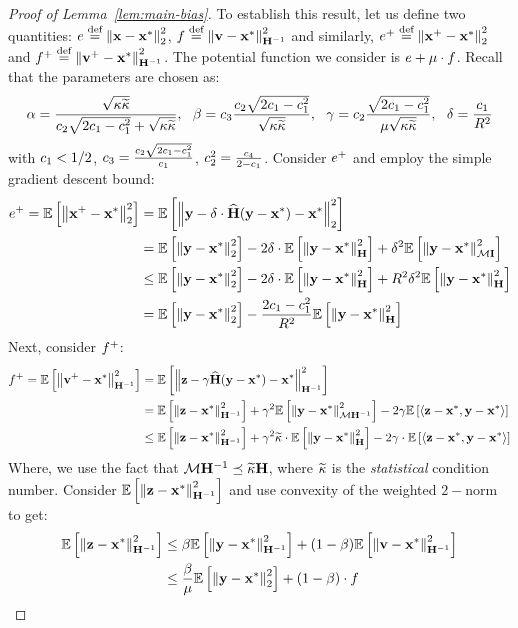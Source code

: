 \begin{proof}[Proof of Lemma~\ref{lem:main-bias}]
To establish this result, let us define two quantities: $e \stackrel{\textrm{def}}{=} {\left\| \mathbf{x}-\mathbf{x}^* \right\|_2^2}$, $f \stackrel{\textrm{def}}{=} {\left\| \mathbf{v}-\mathbf{x}^* \right\|^2_{{\mathbf{H}}^{-1}}}$ and similarly, $e^+ \stackrel{\textrm{def}}{=} {\left\| \mathbf{x}^+-\mathbf{x}^* \right\|_2^2}$ and $f^+ \stackrel{\textrm{def}}{=} {\left\| \mathbf{v}^+-\mathbf{x}^* \right\|^2_{{\mathbf{H}}^{-1}}}$. The potential function we consider is $e + \mu\cdot f$. Recall that the parameters are chosen as:
\begin{align*}
\alpha = \frac{\sqrt{\cnH\cnHh}}{\ctwo\sqrt{2\cone-\cone^2}+\sqrt{\cnH\cnHh}},\ \  \beta = \cthree\frac{\ctwo\sqrt{2\cone-\cone^2}}{\sqrt{\cnH\cnHh}},\ \  \gamma = \ctwo\frac{\sqrt{2\cone-\cone^2}}{\mu\sqrt{\cnH\cnHh}}, \ \ \delta=\frac{\cone}{\infbound}
\end{align*}
with $c_1<1/2$, $c_3=\frac{c_2\sqrt{2c_1-c_1^2}}{c_1}$, $c_2^2=\frac{c_4}{2-c_1}$.
Consider $e^+$ and employ the simple gradient descent bound:
\begin{align}
\label{eq:gd}
\eplus=\E{\twonorm{\xplus-\xs}^2}&=\E{\twonorm{\y-\delta\cdot\Hhat(\y-\xs)-\xs}^2}\nonumber\\
&=\E{\twonorm{\y-\xs}^2}-2\delta\cdot\E{\norm{\y-\xs}^2_{\H}}+\delta^2\E{\norm{\y-\xs}^2_{\M\eye}}\nonumber\\
&\leq\E{\twonorm{\y-\xs}^2}-2\delta\cdot\E{\norm{\y-\xs}^2_{\H}}+\infbound\delta^2\E{\norm{\y-\xs}^2_{\H}}\nonumber\\
&=\E{\twonorm{\y-\xs}^2}-\frac{2\cone-\cone^2}{\infbound}\E{\norm{\y-\xs}^2_{\H}}
\end{align}
Next, consider $f^+$:
\begin{align}
\label{eq:1}
\fplus=\E{\norm{\vplus-\xs}^2_{\Hinv}}&=\E{\norm{\z-\gamma\Hhat(\y-\xs)-\xs}^2_{\Hinv}}\nonumber\\
&=\E{\norm{\z-\xs}^2_{\Hinv}}+\gamma^2\E{\norm{\y-\xs}^2_{\M\Hinv}}-2\gamma\E{\iprod{\z-\xs}{\y-\xs}}\nonumber\\
&\leq\E{\norm{\z-\xs}^2_{\Hinv}}+\gamma^2\cnHh\cdot\E{\norm{\y-\xs}^2_{\H}}-2\gamma\cdot\E{\iprod{\z-\xs}{\y-\xs}}
\end{align}
Where, we use the fact that $\mathcal{M}{\mathbf{H}}^{-1}\preceq\widetilde{\kappa}\mathbf{H}$, where $\widetilde{\kappa}$ is the {\em statistical} condition number.\linebreak
Consider $\mathbb{E}\left[\left\| \mathbf{z}-\mathbf{x}^* \right\|^2_{{\mathbf{H}}^{-1}}\right]$ and use convexity of the weighted $2-$norm to get:
\begin{align}
\label{eq:3}
\E{\norm{\z-\xs}^2_{\Hinv}}&\leq\beta\E{\norm{\y-\xs}^2_{\Hinv}}+(1-\beta)\E{\norm{\v-\xs}^2_{\Hinv}}\nonumber\\
&\leq\frac{\beta}{\mu} \E{\twonorm{\y-\xs}^2}+(1-\beta)\cdot \f

\end{align}
\end{proof}
